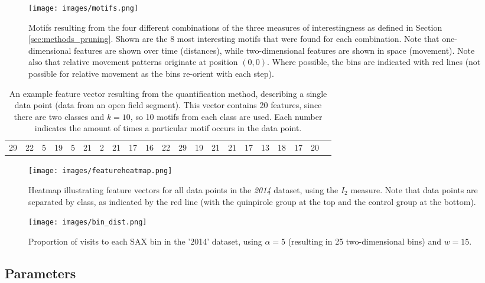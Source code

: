 \documentclass[conference,a4paper,twoside]{IEEEtran}
\begin{document}
\begin{figure}
    \centering
    \texttt{[image: images/motifs.png]}
    \caption{Motifs resulting from the four different combinations of the three measures of interestingness as defined in Section \ref{sec:methods_pruning}. Shown are the 8 most interesting motifs that were found for each combination. Note that one-dimensional features are shown over time (distances), while two-dimensional features are shown in space (movement). Note also that relative movement patterns originate at position $(0,0)$. Where possible, the bins are indicated with red lines (not possible for relative movement as the bins re-orient with each step).}
    \label{fig:motifs}
\end{figure}

\begin{table}
    \centering
    \caption{An example feature vector resulting from the quantification method, describing a single data point (data from an open field segment). This vector contains 20 features, since there are two classes and $k=10$, so 10 motifs from each class are used. Each number indicates the amount of times a particular motif occurs in the data point.}
    \begin{tabular}{ccccccccccccccccccccc}
        29 & 22 &  5 & 19 &  5 & 21 &  2 & 21 & 17 & 16 & 22 & 29 & 19 & 21 & 21 & 17 & 13 & 18 & 17 & 20
    \end{tabular}
    \label{tab:vector}
\end{table}

\begin{figure}
    \centering
    \texttt{[image: images/featureheatmap.png]}
    \caption{Heatmap illustrating feature vectors for all data points in the \emph{2014} dataset, using the $I_2$ measure. Note that data points are separated by class, as indicated by the red line (with the quinpirole group at the top and the control group at the bottom).}
    \label{fig:featureheatmap}
\end{figure}

\begin{figure}
    \centering
    \texttt{[image: images/bin\_dist.png]}
    \caption{Proportion of visits to each SAX bin in the '2014' dataset, using $\alpha = 5$ (resulting in 25 two-dimensional bins) and $w = 15$.}
    \label{fig:bin_dist}
\end{figure}

\subsection{Parameters}
\label{sec:results_parameters}
\end{document}
